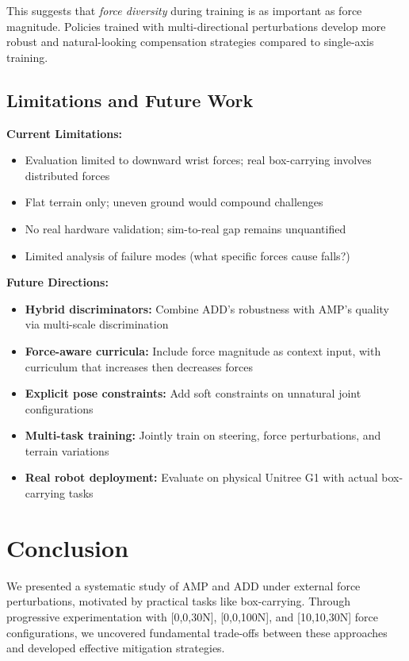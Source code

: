 \documentclass{article}
\begin{document}
This suggests that \emph{force diversity} during training is as important as force magnitude. Policies trained with multi-directional perturbations develop more robust and natural-looking compensation strategies compared to single-axis training.

\subsection{Limitations and Future Work}

\textbf{Current Limitations:}
\begin{itemize}
\item Evaluation limited to downward wrist forces; real box-carrying involves distributed forces
\item Flat terrain only; uneven ground would compound challenges
\item No real hardware validation; sim-to-real gap remains unquantified
\item Limited analysis of failure modes (what specific forces cause falls?)
\end{itemize}

\textbf{Future Directions:}
\begin{itemize}
\item \textbf{Hybrid discriminators:} Combine ADD's robustness with AMP's quality via multi-scale discrimination
\item \textbf{Force-aware curricula:} Include force magnitude as context input, with curriculum that increases then decreases forces
\item \textbf{Explicit pose constraints:} Add soft constraints on unnatural joint configurations
\item \textbf{Multi-task training:} Jointly train on steering, force perturbations, and terrain variations
\item \textbf{Real robot deployment:} Evaluate on physical Unitree G1 with actual box-carrying tasks
\end{itemize}

\section{Conclusion}

We presented a systematic study of AMP and ADD under external force perturbations, motivated by practical tasks like box-carrying. Through progressive experimentation with [0,0,30N], [0,0,100N], and [10,10,30N] force configurations, we uncovered fundamental trade-offs between these approaches and developed effective mitigation strategies.
\end{document}
